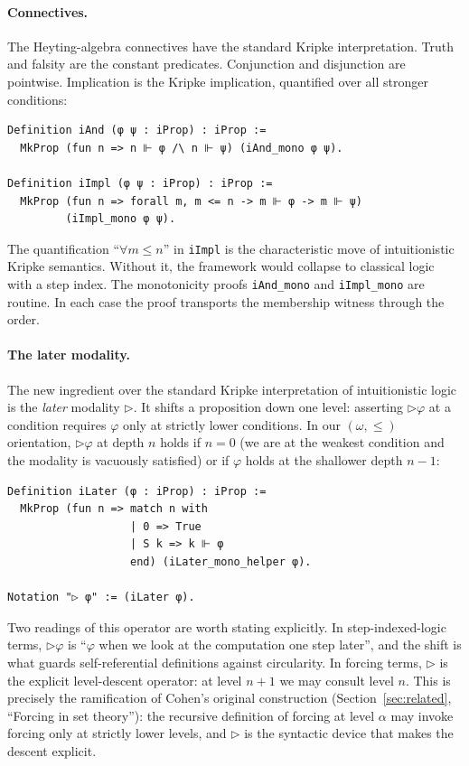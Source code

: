 \paragraph{Connectives.}
The Heyting-algebra connectives have the standard Kripke
interpretation.  Truth and falsity are the constant predicates.
Conjunction and disjunction are pointwise.  Implication is the
Kripke implication, quantified over all stronger conditions:

\begin{lstlisting}
Definition iAnd (φ ψ : iProp) : iProp :=
  MkProp (fun n => n ⊩ φ /\ n ⊩ ψ) (iAnd_mono φ ψ).

Definition iImpl (φ ψ : iProp) : iProp :=
  MkProp (fun n => forall m, m <= n -> m ⊩ φ -> m ⊩ ψ)
         (iImpl_mono φ ψ).
\end{lstlisting}

The quantification ``$\forall m \le n$'' in \texttt{iImpl} is the
characteristic move of intuitionistic Kripke semantics. Without it,
the framework would collapse to classical logic with a step index.
The monotonicity proofs \texttt{iAnd\_mono} and \texttt{iImpl\_mono}
are routine. In each case the proof transports the membership
witness through the order.

\paragraph{The later modality.}
The new ingredient over the standard Kripke interpretation of
intuitionistic logic is the \emph{later} modality $\triangleright$.
It shifts a proposition down one level: asserting $\triangleright
\varphi$ at a condition requires $\varphi$ only at strictly lower
conditions.  In our $(\omega, \le)$ orientation, $\triangleright \varphi$ at depth $n$ holds if $n = 0$ (we are at the weakest condition and the modality is vacuously satisfied) or if $\varphi$ holds at the shallower depth $n - 1$:

\begin{lstlisting}
Definition iLater (φ : iProp) : iProp :=
  MkProp (fun n => match n with
                   | 0 => True
                   | S k => k ⊩ φ
                   end) (iLater_mono_helper φ).

Notation "▷ φ" := (iLater φ).
\end{lstlisting}

Two readings of this operator are worth stating explicitly.  In
step-indexed-logic terms, $\triangleright \varphi$ is ``$\varphi$ when
we look at the computation one step later'', and the shift is what
guards self-referential definitions against circularity.  In
forcing terms, $\triangleright$ is the explicit level-descent
operator: at level $n+1$ we may consult level $n$.  This is precisely
the ramification of Cohen's original construction (Section~\ref{sec:related}, ``Forcing in set theory''): the recursive
definition of forcing at level $\alpha$ may invoke forcing only at
strictly lower levels, and $\triangleright$ is the syntactic device
that makes the descent explicit.

